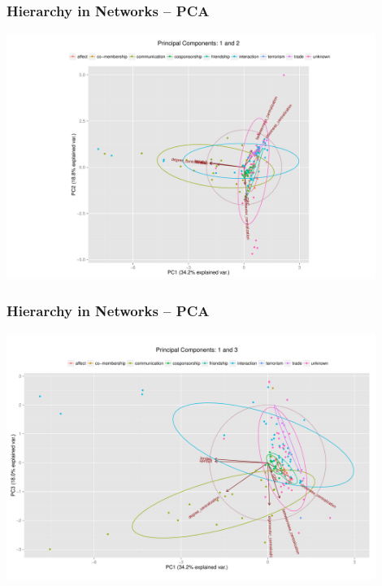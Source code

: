 \documentclass{beamer}
\newenvironment{changemargin}[2]{%
	\begin{list}{}{%
			\setlength{\topsep}{0pt}%
			\setlength{\leftmargin}{#1}%
			\setlength{\rightmargin}{#2}%
			\setlength{\listparindent}{\parindent}%
			\setlength{\itemindent}{\parindent}%
			\setlength{\parsep}{\parskip}%
		}%
		\item[]}{\end{list}}
\begin{document}
\begin{frame}\frametitle{Hierarchy in Networks -- PCA}
	\begin{changemargin}{-2cm}{ -2cm}
		\centering
		\includegraphics[width=12cm, height=8cm]{images/Observed_PCA_Components1_2.pdf}
	\end{changemargin}
\end{frame}

\begin{frame}\frametitle{Hierarchy in Networks -- PCA}
	\begin{changemargin}{-2cm}{ -2cm}
		\centering
		\includegraphics[width=12cm, height=8cm]{images/Observed_PCA_Components1_3.pdf}
	\end{changemargin}
\end{frame}
\end{document}
